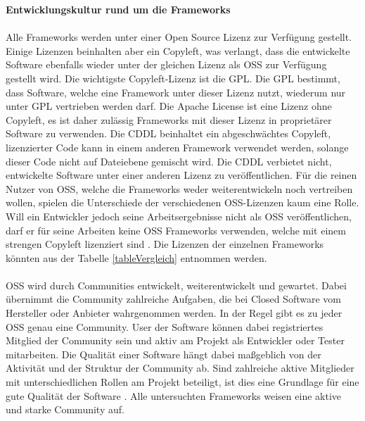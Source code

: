 {\large \textbf{Entwicklungskultur rund um die Frameworks}}\\\\
Alle Frameworks werden unter einer Open Source Lizenz zur Verfügung gestellt. Einige Lizenzen beinhalten aber ein Copyleft, was verlangt, dass die entwickelte Software ebenfalls wieder unter der gleichen Lizenz als \acrfull{OSS} zur Verfügung gestellt wird. Die wichtigste Copyleft-Lizenz ist die \acrfull{GPL}. Die GPL bestimmt, dass Software, welche eine Framework unter dieser Lizenz nutzt, wiederum nur unter GPL vertrieben werden darf. Die Apache License ist eine Lizenz ohne Copyleft, es ist daher zulässig Frameworks mit dieser Lizenz in proprietärer Software zu verwenden. Die \acrfull{CDDL} beinhaltet ein abgeschwächtes Copyleft, lizenzierter Code kann in einem anderen Framework verwendet werden, solange dieser Code nicht auf Dateiebene gemischt wird. Die CDDL verbietet nicht, entwickelte Software unter einer anderen Lizenz zu veröffentlichen. Für die reinen Nutzer von OSS, welche die Frameworks weder weiterentwickeln noch vertreiben wollen, spielen die Unterschiede der verschiedenen OSS-Lizenzen kaum eine Rolle. Will ein Entwickler jedoch seine Arbeitsergebnisse nicht als OSS veröffentlichen, darf er für seine Arbeiten keine OSS Frameworks verwenden, welche mit einem strengen Copyleft lizenziert sind \cite{openSource}. Die Lizenzen der einzelnen Frameworks könnten aus der Tabelle \ref{tableVergleich} entnommen werden.
\\\\
OSS wird durch Communities entwickelt, weiterentwickelt und gewartet. Dabei übernimmt die Community zahlreiche Aufgaben, die bei Closed Software vom Hersteller oder Anbieter wahrgenommen werden. In der Regel gibt es zu jeder OSS genau eine Community. User der Software können dabei registriertes Mitglied der Community sein und aktiv am Projekt als Entwickler oder Tester mitarbeiten. Die Qualität einer Software hängt dabei maßgeblich von der Aktivität und der Struktur der Community ab. Sind zahlreiche aktive Mitglieder mit unterschiedlichen Rollen am Projekt beteiligt, ist dies eine Grundlage für eine gute Qualität der Software \cite{openSource:community}. Alle untersuchten Frameworks weisen eine aktive und starke Community auf.
\\\\
